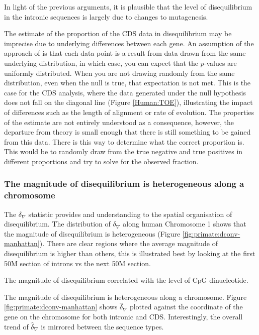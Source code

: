 In light of the previous arguments, it is plausible that the level of disequilibrium in the intronic sequences is largely due to changes to mutagenesis. 

The estimate of the proportion of the CDS data in disequilibrium may be imprecise due to underlying differences between each gene. An assumption of the approach of \cite{Storey2003StatisticalStudies} is that each data point is a result from data drawn from the same underlying distribution, in which case, you can expect that the $p$-values are uniformly distributed. When you are not drawing randomly from the same distribution, even when the null is true, that expectation is not met. This is the case for the CDS analysis, where the data generated under the null hypothesis does not fall on the diagonal line (Figure \ref{Human:TOE}), illustrating the impact of differences such as the length of alignment or rate of evolution. The properties of the estimate are not entirely understood as a consequence, however, the departure from theory is small enough that there is still something to be gained from this data. There is this way to determine what the correct proportion is. This would be to randomly draw from the true negative and true positives in different proportions and try to solve for the observed fraction. 

\subsubsection{The magnitude of disequilibrium is heterogeneous along a chromosome }

The $\delta_\nabla$ statistic provides and understanding to the spatial organisation of disequilibrium. The distribution of $\delta_\nabla$ along human Chromosome 1 shows that the magnitude of disequilibrium is heterogeneous (Figure \ref{fig:primate:dconv-manhattan}). There are clear regions where the average magnitude of disequilibrium is higher than others, this is illustrated best by looking at the first 50M section of introns vs the next 50M section. 


The magnitude of disequilibrium correlated with the level of CpG dinucleotide. 


The magnitude of disequilibrium is heterogeneous along a chromosome. Figure \ref{fig:primate:dconv-manhattan} shows $\hat \delta_\nabla$ plotted against the coordinate of the gene on the chromosome for both intronic and CDS.  Interestingly, the overall trend of $\hat \delta_\nabla$ is mirrored between the sequence types. 



